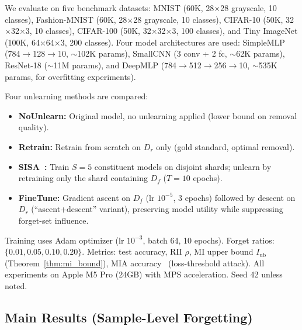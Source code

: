 \documentclass[journal]{IEEEtran}
\theoremstyle{definition}
\begin{document}
We evaluate on five benchmark datasets: MNIST (60K, 28$\times$28 grayscale, 10 classes), Fashion-MNIST (60K, 28$\times$28 grayscale, 10 classes), CIFAR-10 (50K, 32$\times$32$\times$3, 10 classes), CIFAR-100 (50K, 32$\times$32$\times$3, 100 classes), and Tiny ImageNet (100K, 64$\times$64$\times$3, 200 classes). Four model architectures are used: SimpleMLP (784$\to$128$\to$10, $\sim$102K params), SmallCNN (3 conv + 2 fc, $\sim$62K params), ResNet-18 ($\sim$11M params), and DeepMLP (784$\to$512$\to$256$\to$10, $\sim$535K params, for overfitting experiments).

Four unlearning methods are compared:
\begin{itemize}
\item \textbf{NoUnlearn:} Original model, no unlearning applied (lower bound on removal quality).
\item \textbf{Retrain:} Retrain from scratch on $D_r$ only (gold standard, optimal removal).
\item \textbf{SISA~\cite{bourtoule2021machine}:} Train $S=5$ constituent models on disjoint shards; unlearn by retraining only the shard containing $D_f$ ($T=10$ epochs).
\item \textbf{FineTune:} Gradient ascent on $D_f$ (lr $10^{-5}$, 3 epochs) followed by descent on $D_r$ (``ascent+descent'' variant), preserving model utility while suppressing forget-set influence.
\end{itemize}

Training uses Adam optimizer (lr $10^{-3}$, batch 64, 10 epochs). Forget ratios: $\{0.01, 0.05, 0.10, 0.20\}$. Metrics: test accuracy, RII $\rho$, MI upper bound $I_{\mathrm{ub}}$ (Theorem~\ref{thm:mi_bound}), MIA accuracy~\cite{shokri2017membership} (loss-threshold attack). All experiments on Apple M5 Pro (24GB) with MPS acceleration. Seed 42 unless noted.

\subsection{Main Results (Sample-Level Forgetting)}
\end{document}
